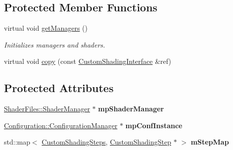 \subsection*{Protected Member Functions}
\begin{DoxyCompactItemize}
\item 
\mbox{\label{class_geometry_engine_1_1_custom_shading_1_1_custom_shading_interface_a337c599d79465f95890b3e6b2ed58d00}} 
virtual void \mbox{\hyperlink{class_geometry_engine_1_1_custom_shading_1_1_custom_shading_interface_a337c599d79465f95890b3e6b2ed58d00}{get\+Managers}} ()
\begin{DoxyCompactList}\small\item\em Initializes managers and shaders. \end{DoxyCompactList}\item 
virtual void \mbox{\hyperlink{class_geometry_engine_1_1_custom_shading_1_1_custom_shading_interface_a7ecb7c9e61cb2e8f2cca7a4f2f156539}{copy}} (const \mbox{\hyperlink{class_geometry_engine_1_1_custom_shading_1_1_custom_shading_interface}{Custom\+Shading\+Interface}} \&ref)
\end{DoxyCompactItemize}
\subsection*{Protected Attributes}
\begin{DoxyCompactItemize}
\item 
\mbox{\label{class_geometry_engine_1_1_custom_shading_1_1_custom_shading_interface_a5724c1310c865126c986b0ee0e862cd5}} 
\mbox{\hyperlink{class_shader_files_1_1_shader_manager}{Shader\+Files\+::\+Shader\+Manager}} $\ast$ {\bfseries mp\+Shader\+Manager}
\item 
\mbox{\label{class_geometry_engine_1_1_custom_shading_1_1_custom_shading_interface_a6fe0b6548231519a836658ff5e9adcd8}} 
\mbox{\hyperlink{class_configuration_1_1_configuration_manager}{Configuration\+::\+Configuration\+Manager}} $\ast$ {\bfseries mp\+Conf\+Instance}
\item 
\mbox{\label{class_geometry_engine_1_1_custom_shading_1_1_custom_shading_interface_a7ac880b1034789a03a164559c013c8a3}} 
std\+::map$<$ \mbox{\hyperlink{namespace_geometry_engine_1_1_custom_shading_a2dc236a5b567da5099069ce2b2be5609}{Custom\+Shading\+Steps}}, \mbox{\hyperlink{class_geometry_engine_1_1_custom_shading_1_1_custom_shading_step}{Custom\+Shading\+Step}} $\ast$ $>$ {\bfseries m\+Step\+Map}
\end{DoxyCompactItemize}


